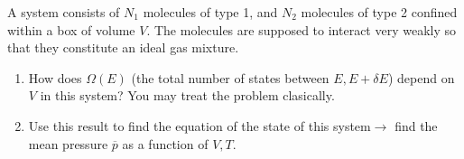 \documentclass{article}
\begin{document}
\begin{problem}[Reif 3.5]
    A system consists of $N_1$ molecules of type 1, and $N_2$ molecules of type 2 confined within a box of volume $V$. The molecules are supposed to interact very weakly so that they constitute an ideal gas mixture. 
    \begin{enumerate}[label=(\alph*)]
        \item How does $\Omega(E)$ (the total number of states between $E,E+\delta E$) depend on $V$ in this system? You may treat the problem clasically. 
        \item Use this result to find the equation of the state of this system$\rightarrow$ find the mean pressure $\overline{p}$ as a function of $V,T$.
    \end{enumerate}
    \answerline
\end{problem}
\end{document}

